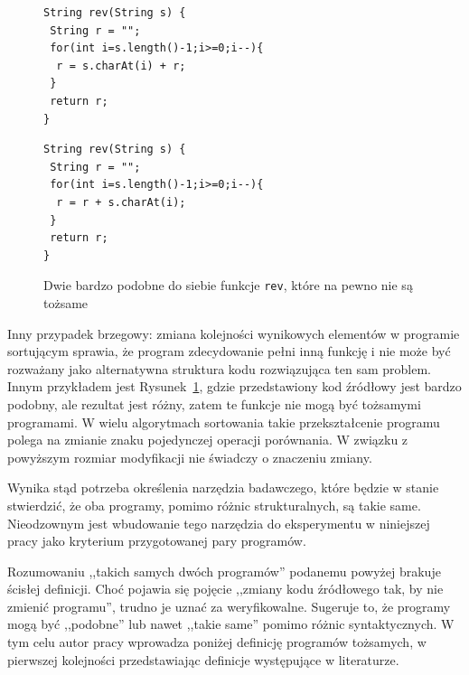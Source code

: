 \begin{figure}[h]
    \centering
    \begin{minipage}[t]{0.45\linewidth}
        \lstset{
            basicstyle=\ttfamily\small,
            frame=single,
            numbers=left,
            numberstyle=\tiny,
            language=Java
        }
        \begin{lstlisting}
String rev(String s) {
 String r = "";
 for(int i=s.length()-1;i>=0;i--){
  r = s.charAt(i) + r;
 }
 return r;
}
        \end{lstlisting}
    \end{minipage}
    \hfill
    \begin{minipage}[t]{0.45\linewidth}
        \lstset{
            basicstyle=\ttfamily\small,
            frame=single,
            numbers=left,
            numberstyle=\tiny,
            language=Java
        }
        \begin{lstlisting}
String rev(String s) {
 String r = "";
 for(int i=s.length()-1;i>=0;i--){
  r = r + s.charAt(i);
 }
 return r;
}
        \end{lstlisting}
    \end{minipage}
    \caption{Dwie bardzo podobne do siebie funkcje \texttt{rev}, które na pewno nie są tożsame}
    \label{fig:rozny_kod}
\end{figure}

Inny przypadek brzegowy: zmiana kolejności wynikowych elementów w programie sortującym sprawia, że program zdecydowanie
pełni inną funkcję i nie może być rozważany jako alternatywna struktura kodu rozwiązująca ten sam problem.
Innym przykładem jest Rysunek~\ref{fig:rozny_kod}, gdzie przedstawiony kod źródłowy jest bardzo podobny, ale
rezultat jest różny, zatem te funkcje nie mogą być tożsamymi programami.
W wielu algorytmach sortowania takie przekształcenie programu polega na zmianie znaku pojedynczej operacji porównania.
W związku z powyższym rozmiar modyfikacji nie świadczy o znaczeniu zmiany.

Wynika stąd potrzeba określenia narzędzia badawczego, które będzie w stanie stwierdzić, że oba programy, pomimo różnic
strukturalnych, są takie same.
Nieodzownym jest wbudowanie tego narzędzia do eksperymentu w niniejszej pracy jako kryterium przygotowanej pary
programów.

Rozumowaniu ,,takich samych dwóch programów'' podanemu powyżej brakuje ścisłej definicji.
Choć pojawia się pojęcie ,,zmiany kodu źródłowego tak, by nie zmienić programu'', trudno je uznać za weryfikowalne.
Sugeruje to, że programy mogą być ,,podobne'' lub nawet ,,takie same'' pomimo różnic syntaktycznych.
W tym celu autor pracy wprowadza poniżej definicję programów tożsamych, w pierwszej kolejności przedstawiając
definicje występujące w literaturze.

